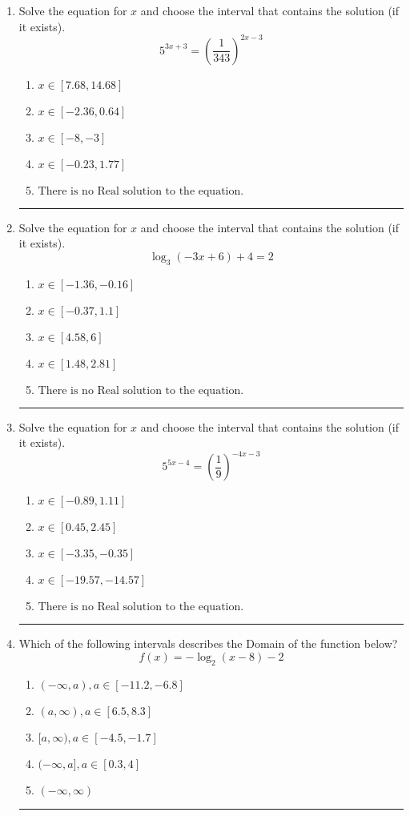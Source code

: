 \documentclass[14pt]{extbook}
\newcommand{\litem}[1]{\item#1\hspace*{-1cm}\rule{\textwidth}{0.4pt}}
\begin{document}
\begin{enumerate}
{\begin{enumerate}[label=\Alph*.]
\end{enumerate} }
\litem{
Solve the equation for $x$ and choose the interval that contains the solution (if it exists).\[ 5^{3x+3} = \left(\frac{1}{343}\right)^{2x-3} \]\begin{enumerate}[label=\Alph*.]
\item \( x \in [7.68, 14.68] \)
\item \( x \in [-2.36, 0.64] \)
\item \( x \in [-8, -3] \)
\item \( x \in [-0.23, 1.77] \)
\item \( \text{There is no Real solution to the equation.} \)

\end{enumerate} }
\litem{
Solve the equation for $x$ and choose the interval that contains the solution (if it exists).\[ \log_{3}{(-3x+6)}+4 = 2 \]\begin{enumerate}[label=\Alph*.]
\item \( x \in [-1.36, -0.16] \)
\item \( x \in [-0.37, 1.1] \)
\item \( x \in [4.58, 6] \)
\item \( x \in [1.48, 2.81] \)
\item \( \text{There is no Real solution to the equation.} \)

\end{enumerate} }
\litem{
Solve the equation for $x$ and choose the interval that contains the solution (if it exists).\[ 5^{5x-4} = \left(\frac{1}{9}\right)^{-4x-3} \]\begin{enumerate}[label=\Alph*.]
\item \( x \in [-0.89, 1.11] \)
\item \( x \in [0.45, 2.45] \)
\item \( x \in [-3.35, -0.35] \)
\item \( x \in [-19.57, -14.57] \)
\item \( \text{There is no Real solution to the equation.} \)

\end{enumerate} }
\litem{
Which of the following intervals describes the Domain of the function below?\[ f(x) = -\log_2{(x-8)}-2 \]\begin{enumerate}[label=\Alph*.]
\item \( (-\infty, a), a \in [-11.2, -6.8] \)
\item \( (a, \infty), a \in [6.5, 8.3] \)
\item \( [a, \infty), a \in [-4.5, -1.7] \)
\item \( (-\infty, a], a \in [0.3, 4] \)
\item \( (-\infty, \infty) \)


\end{enumerate}}
\end{enumerate}
\end{document}
